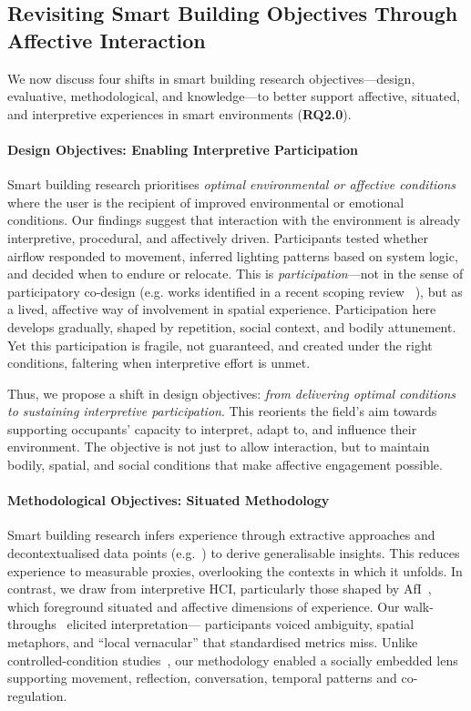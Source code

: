 \subsection{Revisiting Smart Building Objectives Through Affective Interaction}
\label{sec:ch3-objectives}
We now discuss four shifts in smart building research objectives---design, evaluative, methodological, and knowledge---to better support affective, situated, and interpretive experiences in smart environments (\textbf{RQ2.0}).

\paragraph{Design Objectives: Enabling Interpretive Participation}
Smart building research prioritises \textit{optimal environmental or affective conditions} where the user is the recipient of improved environmental or emotional conditions. Our findings suggest that interaction with the environment is already interpretive, procedural, and affectively driven. Participants tested whether airflow responded to movement, inferred lighting patterns based on system logic, and decided when to endure or relocate. This is \textit{participation}---not in the sense of participatory co-design (e.g. works identified in a recent scoping review ~\cite{rao2025designing}), but as a lived, affective way of involvement in spatial experience. Participation here develops gradually, shaped by repetition, social context, and bodily attunement. Yet this participation is fragile, not guaranteed, and created under the right conditions, faltering when interpretive effort is unmet.

Thus, we propose a shift in design objectives: \textit{from delivering optimal conditions to sustaining interpretive participation}. This reorients the field’s aim towards supporting occupants’ capacity to interpret, adapt to, and influence their environment. The objective is not just to allow interaction, but to maintain bodily, spatial, and social conditions that make affective engagement possible.

\paragraph{Methodological Objectives: Situated Methodology}
Smart building research infers experience through extractive approaches and decontextualised data points (e.g.~\cite{daissaoui2020iot, dalton2020habitech}) to derive generalisable insights. This reduces experience to measurable proxies, overlooking the contexts in which it unfolds. In contrast, we draw from interpretive HCI, particularly those shaped by AfI~\cite{ahmadpour2025affective}, which foreground situated and affective dimensions of experience. Our walk-throughs~\cite{crivellaro2015contesting, mitchell2020no} elicited interpretation--- participants voiced ambiguity, spatial metaphors, and ``local vernacular'' that standardised metrics miss. Unlike controlled-condition studies~\cite{bower2019impact}, our methodology enabled a socially embedded lens supporting movement, reflection, conversation, temporal patterns and co-regulation.

